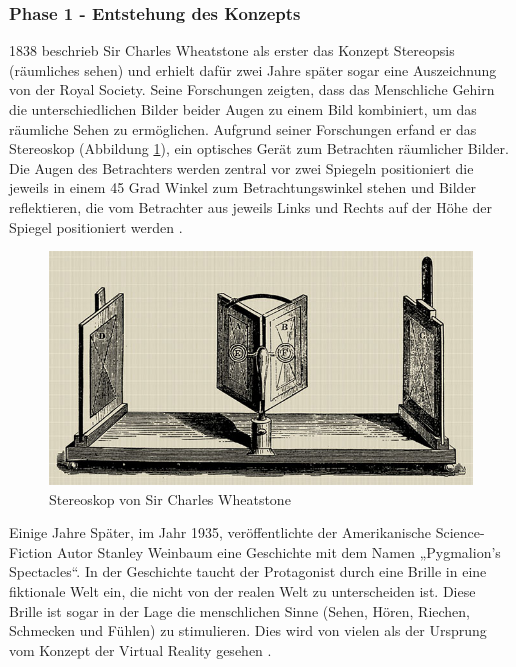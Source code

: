 \subsubsection{Phase 1 - Entstehung des Konzepts}
1838 beschrieb Sir Charles Wheatstone als erster das Konzept Stereopsis (räumliches sehen) und erhielt dafür zwei Jahre später sogar eine Auszeichnung von der Royal Society. Seine Forschungen zeigten, dass das Menschliche Gehirn die unterschiedlichen Bilder beider Augen zu einem Bild kombiniert, um das räumliche Sehen zu ermöglichen. Aufgrund seiner Forschungen erfand er das Stereoskop (Abbildung \ref{fig:Stereoskop}), ein optisches Gerät zum Betrachten räumlicher Bilder. Die Augen des Betrachters werden zentral vor zwei Spiegeln positioniert die jeweils in einem 45 Grad Winkel zum Betrachtungswinkel stehen und Bilder reflektieren, die vom Betrachter aus jeweils Links und Rechts auf der Höhe der Spiegel positioniert werden \cite{20}.
\begin{figure}[h]
	\centering
	\includegraphics[width=0.5\linewidth]{Bilder/A13_Stereoskop}
	\caption{Stereoskop von Sir Charles Wheatstone \cite{20}}
	\label{fig:Stereoskop}
\end{figure}
\newline
\noindent
Einige Jahre Später, im Jahr 1935, veröffentlichte der Amerikanische Science-Fiction Autor Stanley Weinbaum eine Geschichte mit dem Namen „Pygmalion’s Spectacles“. In der Geschichte taucht der Protagonist durch eine Brille in eine fiktionale Welt ein, die nicht von der realen Welt zu unterscheiden ist. Diese Brille ist sogar in der Lage die menschlichen Sinne (Sehen, Hören, Riechen, Schmecken und Fühlen) zu stimulieren. Dies wird von vielen als der Ursprung vom Konzept der Virtual Reality gesehen \cite{20}.

